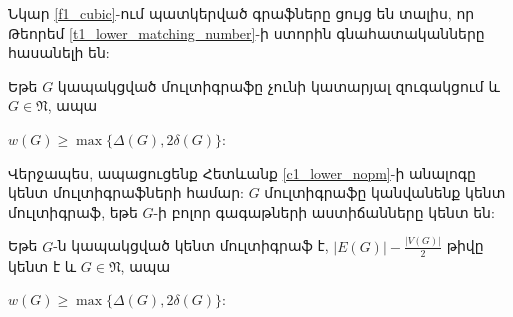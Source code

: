 Նկար \ref{f1_cubic}-ում պատկերված գրաֆները ցույց են տալիս, որ Թեորեմ \ref{t1_lower_matching_number}-ի ստորին գնահատականները հասանելի են: 

\begin{corollary}
\label{c1_lower_nopm} Եթե $G$ կապակցված մուլտիգրաֆը չունի կատարյալ զուգակցում և $G\in \mathfrak{N}$, ապա
\begin{center}
$w(G)\geq \max\{\Delta(G),2\delta(G)\}$:
\end{center}
\end{corollary}



Վերջապես, ապացուցենք Հետևանք \ref{c1_lower_nopm}-ի անալոգը կենտ մուլտիգրաֆների համար: $G$ մուլտիգրաֆը կանվանենք կենտ մուլտիգրաֆ, եթե $G$-ի բոլոր գագաթների աստիճանները կենտ են:

\begin{theorem}
\label{t1_lower_odd} Եթե $G$-ն կապակցված կենտ մուլտիգրաֆ է, $\vert
E(G)\vert-\frac{\vert V(G)\vert}{2}$ թիվը կենտ է և $G\in \mathfrak{N}$,
ապա
\begin{center}
$w(G)\geq \max\{\Delta(G),2\delta(G)\}$:
\end{center}
\end{theorem}
